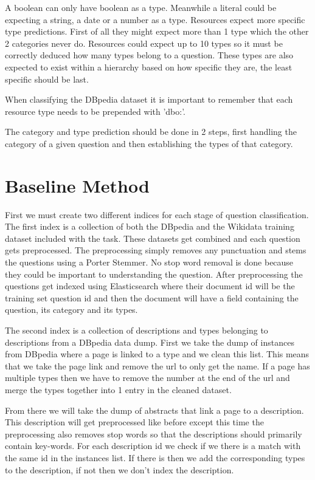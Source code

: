 \documentclass[sigconf]{acmart}
\begin{document}
A boolean can only have boolean as a type. Meanwhile a literal could be expecting a string, a date or a number as a type. Resources expect more specific type predictions. First of all they might expect more than 1 type which the other 2 categories never do. Resources could expect up to 10 types so it must be correctly deduced how many types belong to a question. These types are also expected to exist within a hierarchy based on how specific they are, the least specific should be last.

When classifying the DBpedia dataset it is important to remember that each resource type needs to be prepended with 'dbo:'.

The category and type prediction should be done in 2 steps, first handling the category of a given question and then establishing the types of that category.


\section{Baseline Method}
First we must create two different indices for each stage of question classification. The first index is a collection of both the DBpedia and the Wikidata training dataset included with the task. These datasets get combined and each question gets preprocessed. The preprocessing simply removes any punctuation and stems the questions using a Porter Stemmer. No stop word removal is done because they could be important to understanding the question. After preprocessing the questions get indexed using Elasticsearch where their document id will be the training set question id and then the document will have a field containing the question, its category and its types. 

The second index is a collection of descriptions and types belonging to descriptions from a DBpedia data dump. First we take the dump of instances from DBpedia where a page is linked to a type and we clean this list. This means that we take the page link and remove the url to only get the name. If a page has multiple types then we have to remove the number at the end of the url and merge the types together into 1 entry in the cleaned dataset.

From there we will take the dump of abstracts that link a page to a description. This description will get preprocessed like before except this time the preprocessing also removes stop words so that the descriptions should primarily contain key-words. For each description id we check if we there is a match with the same id in the instances list. If there is then we add the corresponding types to the description, if not then we don't index the description. 
\end{document}
